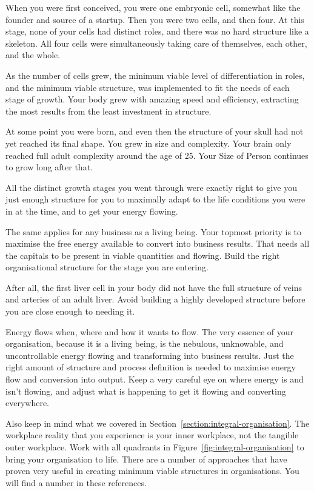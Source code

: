 When you were first conceived, you were one embryonic cell, somewhat like the founder and source of a startup. Then you were two cells, and then four. At this stage, none of your cells had distinct roles, and there was no hard structure like a skeleton. All four cells were simultaneously taking care of themselves, each other, and the whole. 


As the number of cells grew, the minimum viable level of differentiation in roles, and the minimum viable structure, was implemented to fit the needs of each stage of growth. Your body grew with amazing speed and efficiency, extracting the most results from the least investment in structure.


At some point you were born, and even then the structure of your skull had not yet reached its final shape. You grew in size and complexity. Your brain only reached full adult complexity around the age of 25. Your Size of Person  continues to grow long after that.


All the distinct growth stages you went through were exactly right to give you just enough structure for you to maximally adapt to the life conditions you were in at the time, and to get your energy flowing. 


The same applies for any business as a living being. Your topmost priority is to maximise the free energy available to convert into business results. That needs all the capitals to be present in viable quantities and flowing. Build the right organisational structure for the stage you are entering.


After all, the first liver cell in your body did not have the full structure of veins and arteries of an adult liver. Avoid building a highly developed structure before you are close enough to needing it. 


Energy flows when, where and how it wants to flow. The very essence of your organisation, because it is a living being, is the nebulous, unknowable, and uncontrollable energy flowing and transforming into business results. Just the right amount of structure and process definition is needed to maximise energy flow and conversion into output. Keep a very careful eye on where energy is and isn’t flowing, and adjust what is happening to get it flowing and converting everywhere.


Also keep in mind what we covered in Section~\ref{section:integral-organisation}. The workplace reality that you experience is your inner workplace, not the tangible outer workplace. Work with all quadrants in Figure~\ref{fig:integral-organisation} to bring your organisation to life. There are a number of approaches that have proven very useful in creating minimum viable structures in organisations. You will find a number in these references\cite{aoh, possert-playbook, ganescu-playbook, lipmanowicz-liberating, breidenbach-new}.


